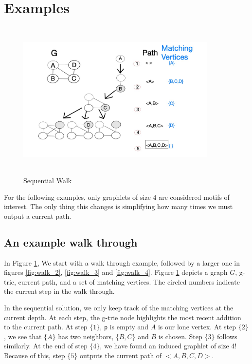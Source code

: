 \documentclass[12pt,twoside]{reedthesis}
\begin{document}
\section{Examples} \label{sec:seq_ex}

\begin{figure}[h]
	\centering
	\includegraphics[width=10cm, height=8cm]{seq_walk_1}
	\caption{Sequential Walk}
	\label{fig:walk_1}
\end{figure}
For the following examples, only graphlets of size 4 are considered motifs of interest. The only thing this changes is simplifying how many times we must output a current path.

\subsection{An example walk through}
In Figure \ref{fig:walk_1}, We start with a walk through example, followed by a larger one in figures \ref{fig:walk_2}, \ref{fig:walk_3} and \ref{fig:walk_4}. Figure \ref{fig:walk_1} depicts a graph $G$, g-trie, current path, and a set of matching vertices. The circled numbers indicate the current step in the walk through. 
	
In the sequential solution, we only keep track of the matching vertices at the current depth. At each step, the g-trie node highlights the most recent addition to the current path. At step $\{1\}$, \texttt{p} is empty and $A$ is our lone vertex. At step $\{2\}$, we see that $\{A\}$ has two neighbors, $\{B, C\}$ and $B$ is chosen. Step $\{3\}$ follows similarly. At the end of step $\{4\}$, we have found an induced graphlet of size 4! Because of this, step $\{5\}$ outputs the current path of $<A,B,C,D>$.
	
\end{document}
